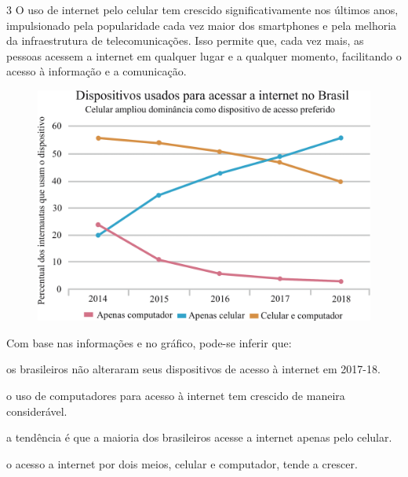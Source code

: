\pagebreak
\num{3} O uso de internet pelo celular tem crescido significativamente nos
últimos anos, impulsionado pela popularidade cada vez maior dos
smartphones e pela melhoria da infraestrutura de telecomunicações. Isso
permite que, cada vez mais, as pessoas acessem a internet em qualquer lugar e a qualquer
momento, facilitando o acesso à informação e a comunicação.

\begin{figure}[htpb!]
\centering
\includegraphics[width=\textwidth]{./ilustras-mat/modulo_13_-treino_3.png}
\end{figure}


Com base nas informações e no gráfico, pode-se inferir que:

\begin{escolha}

  \item os brasileiros não alteraram seus dispositivos de acesso à internet em 2017-18.

  \item o uso de computadores para acesso à internet tem crescido de maneira considerável.

  \item a tendência é que a maioria dos brasileiros acesse a internet apenas pelo celular.

  \item o acesso a internet por dois meios, celular e computador, tende a crescer.

\end{escolha}


